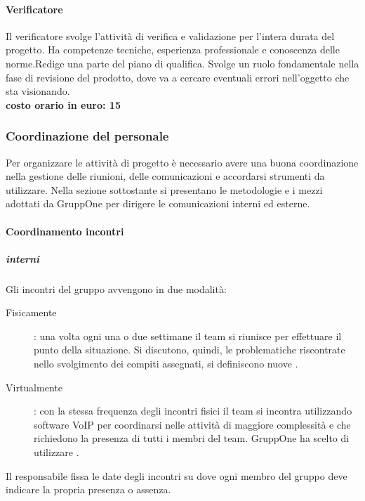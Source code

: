 \documentclass[../norme-di-progetto.tex]{subfiles}
\begin{document}
\paragraph{Verificatore}%
\label{par:verificatore}
Il verificatore svolge l'attività di verifica e validazione per l'intera durata del progetto.
Ha competenze tecniche, esperienza professionale e conoscenza delle norme.Redige una parte del piano di qualifica.
Svolge un ruolo fondamentale nella fase di revisione del prodotto, dove va a cercare eventuali errori nell'oggetto che sta visionando.
\\\newline\textbf{costo orario in euro: 15}

\subsubsection{Coordinazione del personale}%
\label{subs:coordinazione_del_personale}
Per organizzare le attività di progetto è necessario avere una buona coordinazione nella gestione delle riunioni, delle comunicazioni e accordarsi strumenti da utilizzare.
Nella sezione sottostante si presentano le metodologie e i mezzi adottati da GruppOne per dirigere le comunicazioni interni ed esterne.

\paragraph{Coordinamento incontri}%
\label{par:coordinamento_incontri}

\subparagraph{interni}%
\label{subp:coordinamento_incontri/interni}
Gli incontri del gruppo avvengono in due modalità:
\begin{description}
  \item [Fisicamente]: una volta ogni una o due settimane il team si riunisce per effettuare il punto della situazione. Si discutono, quindi, le problematiche riscontrate nello svolgimento dei compiti assegnati, si definiscono nuove .
  \item [Virtualmente]: con la stessa frequenza degli incontri fisici il team si incontra utilizzando software VoIP per coordinarsi nelle attività di maggiore complessità e che richiedono la presenza di tutti i membri del team. GruppOne ha scelto di utilizzare .
\end{description}
Il responsabile fissa le date degli incontri su  dove ogni membro del gruppo deve indicare la propria presenza o assenza.
\end{document}

